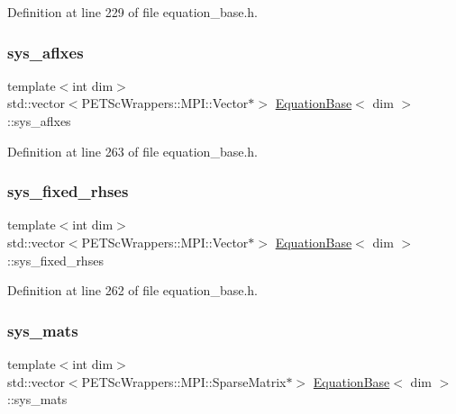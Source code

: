 Definition at line 229 of file equation\+\_\+base.\+h.

\mbox{\label{class_equation_base_afe48e9f1d2f6b4f13cefe80d43d18300}} 
\subsubsection{\texorpdfstring{sys\+\_\+aflxes}{sys\_aflxes}}
{\footnotesize\ttfamily template$<$int dim$>$ \\
std\+::vector$<$P\+E\+T\+Sc\+Wrappers\+::\+M\+P\+I\+::\+Vector$\ast$$>$ \hyperlink{class_equation_base}{Equation\+Base}$<$ dim $>$\+::sys\+\_\+aflxes\hspace{0.3cm}{\ttfamily [private]}}



Definition at line 263 of file equation\+\_\+base.\+h.

\mbox{\label{class_equation_base_a556e9d3b402dae0303e786e2ef38a29b}} 
\subsubsection{\texorpdfstring{sys\+\_\+fixed\+\_\+rhses}{sys\_fixed\_rhses}}
{\footnotesize\ttfamily template$<$int dim$>$ \\
std\+::vector$<$P\+E\+T\+Sc\+Wrappers\+::\+M\+P\+I\+::\+Vector$\ast$$>$ \hyperlink{class_equation_base}{Equation\+Base}$<$ dim $>$\+::sys\+\_\+fixed\+\_\+rhses\hspace{0.3cm}{\ttfamily [private]}}



Definition at line 262 of file equation\+\_\+base.\+h.

\mbox{\label{class_equation_base_afcdb76718da046b950c466500de44a03}} 
\subsubsection{\texorpdfstring{sys\+\_\+mats}{sys\_mats}}
{\footnotesize\ttfamily template$<$int dim$>$ \\
std\+::vector$<$P\+E\+T\+Sc\+Wrappers\+::\+M\+P\+I\+::\+Sparse\+Matrix$\ast$$>$ \hyperlink{class_equation_base}{Equation\+Base}$<$ dim $>$\+::sys\+\_\+mats\hspace{0.3cm}{\ttfamily [private]}}



